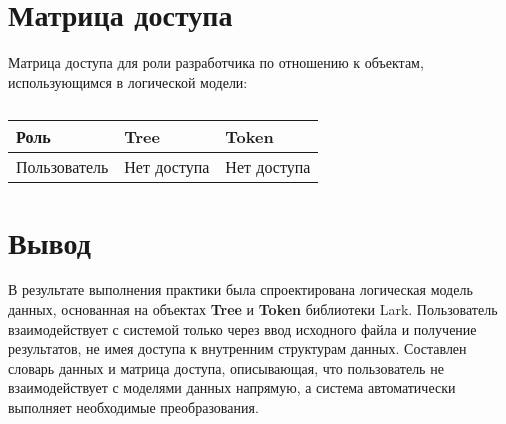 \section{Матрица доступа}

Матрица доступа для роли разработчика по отношению к объектам,
использующимся в логической модели:

\begin{longtable}{|p{3.5cm}|p{5cm}|p{5cm}|}
	\caption{} \\
	\hline
	\textbf{Роль} & \textbf{Tree} & \textbf{Token} \\
	\hline
	\endhead
	Пользователь & Нет доступа & Нет доступа \\ \hline
\end{longtable}

\clearpage

\section*{\LARGE Вывод}

В результате выполнения практики была спроектирована логическая модель данных,
основанная на объектах \textbf{Tree} и \textbf{Token} библиотеки Lark.
Пользователь взаимодействует с системой только через ввод исходного файла
и получение результатов,
не имея доступа к внутренним структурам данных.
Составлен словарь данных и матрица доступа,
описывающая, что пользователь не взаимодействует с моделями данных напрямую,
а система автоматически выполняет необходимые преобразования.

